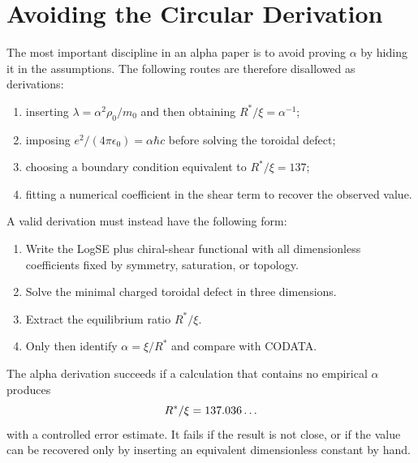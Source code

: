 \documentclass[11pt,a4paper]{article}
\newcommand{\mzero}{m_0}
\begin{document}
\section{Avoiding the Circular Derivation}
\label{sec:circularity}

The most important discipline in an alpha paper is to avoid proving
$\alpha$ by hiding it in the assumptions.  The following routes are
therefore disallowed as derivations:

\begin{enumerate}[label=(\roman*)]
    \item inserting $\lambda=\alpha^2\rho_0/\mzero$ and then obtaining
          $R^*/\xi=\alpha^{-1}$;
    \item imposing $e^2/(4\pi\epsilon_0)=\alpha\hbar c$ before solving the
          toroidal defect;
    \item choosing a boundary condition equivalent to $R^*/\xi=137$;
    \item fitting a numerical coefficient in the shear term to recover the
          observed value.
\end{enumerate}

A valid derivation must instead have the following form:
\begin{enumerate}[label=(D\arabic*)]
    \item Write the LogSE plus chiral-shear functional with all
          dimensionless coefficients fixed by symmetry, saturation, or
          topology.
    \item Solve the minimal charged toroidal defect in three dimensions.
    \item Extract the equilibrium ratio $R^*/\xi$.
    \item Only then identify $\alpha=\xi/R^*$ and compare with CODATA.
\end{enumerate}

\begin{resultbox}
The alpha derivation succeeds if a calculation that contains no empirical
$\alpha$ produces
\[
    R^*/\xi = 137.036\ldots
\]
with a controlled error estimate.  It fails if the result is not close, or
if the value can be recovered only by inserting an equivalent dimensionless
constant by hand.
\end{resultbox}

\end{document}
